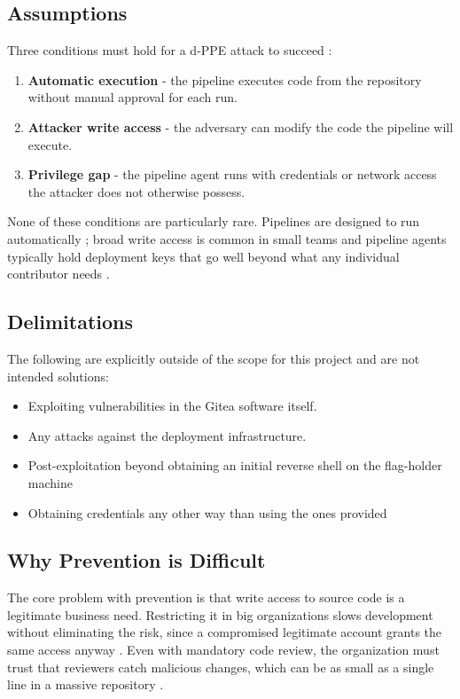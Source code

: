 \documentclass{article}
\begin{document}
\subsection{Assumptions}

Three conditions must hold for a d-PPE attack to succeed \cite{bishopFoxPPE}:

\begin{enumerate}
    \item \textbf{Automatic execution} - the pipeline executes code from the repository without manual approval for each run.
    \item \textbf{Attacker write access} - the adversary can modify the code the pipeline will execute.
    \item \textbf{Privilege gap} - the pipeline agent runs with credentials or network access the attacker does not otherwise possess.
\end{enumerate}

None of these conditions are particularly rare. Pipelines are designed to run automatically \cite{fowlerCI}; broad write access is common in small teams and pipeline agents typically hold deployment keys that go well beyond what any individual contributor needs \cite{owaspPPE}.

\subsection{Delimitations}

The following are explicitly outside of the scope for this project and are not intended solutions:

\begin{itemize}
    \item Exploiting vulnerabilities in the Gitea software itself.
    \item Any attacks against the deployment infrastructure.
    \item Post-exploitation beyond obtaining an initial reverse shell on the flag-holder machine
    \item Obtaining credentials any other way than using the ones provided
\end{itemize}

\subsection{Why Prevention is Difficult}

The core problem with prevention is that write access to source code is a legitimate business need. Restricting it in big organizations slows development without eliminating the risk, since a compromised legitimate account grants the same access anyway \cite{owaspPPE}. Even with mandatory code review, the organization must trust that reviewers catch malicious changes, which can be as small as a single line in a massive repository \cite{bishopFoxPPE}.
\end{document}
